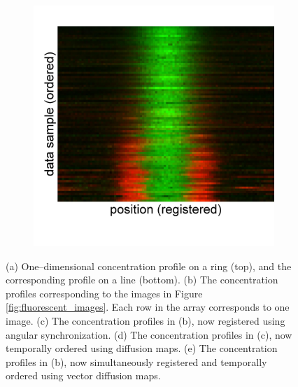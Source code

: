 \documentclass{pnastwo}
\begin{document}
\begin{figure}
\begin{subfigure}{0.2\textwidth}
\caption{}
\label{subfig:1d_aligned_ordered}
\end{subfigure}
\begin{subfigure}{0.2\textwidth}
\includegraphics[width=\textwidth]{registered_ordered_vdm_1d}
\caption{}
\label{subfig:1d_aligned_ordered_vdm}
\end{subfigure}
\caption{(a) One--dimensional concentration profile on a ring (top), and the corresponding profile on a line (bottom). (b) The concentration profiles corresponding to the images in Figure \ref{fig:fluorescent_images}. Each row in the array corresponds to one image. (c) The concentration profiles in (b), now registered using angular synchronization. (d) The concentration profiles in (c), now temporally ordered using diffusion maps. (e) The concentration profiles in (b), now simultaneously registered and temporally ordered using vector diffusion maps. }
\label{fig:1d_demo}
\end{figure}
\end{document}
